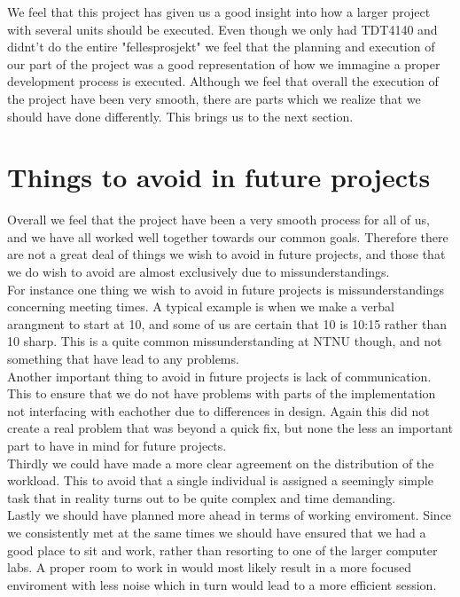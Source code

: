 We feel that this project has given us a good insight into how a larger project with several units should be executed. Even though we only had TDT4140 and didnt't do the entire "fellesprosjekt" we feel that the planning and execution of our part of the project was a good representation of how we immagine a proper development process is executed. Although we feel that overall the execution of the project have been very smooth, there are parts which we realize that we should have done differently. This brings us to the next section.

\section{Things to avoid in future projects}
Overall we feel that the project have been a very smooth process for all of us, and we have all worked well together towards our common goals. Therefore there are not a great deal of things we wish to avoid in future projects, and those that we do wish to avoid are almost exclusively due to missunderstandings. \\
For instance one thing we wish to avoid in future projects is missunderstandings concerning meeting times. A typical example is when we make a verbal arangment to start at 10, and some of us are certain that 10 is 10:15 rather than 10 sharp. This is a quite common missunderstanding at NTNU though, and not something that have lead to any problems. \\
Another important thing to avoid in future projects is lack of communication. This to ensure that we do not have problems with parts of the implementation not interfacing with eachother due to differences in design. Again this did not create a real problem that was beyond a quick fix, but none the less an important part to have in mind for future projects. \\
Thirdly we could have made a more clear agreement on the distribution of the workload. This to avoid that a single individual is assigned a seemingly simple task that in reality turns out to be quite complex and time demanding. \\
Lastly we should have planned more ahead in terms of working enviroment. Since we consistently met at the same times we should have ensured that we had a good place to sit and work, rather than resorting to one of the larger computer labs. A proper room to work in would most likely result in a more focused enviroment with less noise which in turn would lead to a more efficient session.

